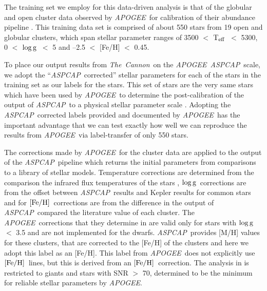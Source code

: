 \documentclass[12pt, preprint]{aastex}
\newcommand{\teff}{\mbox{$\rm T_{eff}$}}
\newcommand{\feh}{\mbox{$\rm [Fe/H]$}}
\newcommand{\logg}{\mbox{$\rm \log g$}}
\newcommand{\tc}{\textsl{The~Cannon}}
\newcommand{\apogee}{\textsl{APOGEE}}
\newcommand{\aspcap}{\textsl{ASPCAP}}
\begin{document}
The training set we employ for this data-driven analysis is that of the globular and open cluster data observed by \apogee\ for calibration of their abundance pipeline \citep{Meszaros2013}. This training data set is comprised of about 550 stars from 19 open and globular clusters, which span stellar parameter ranges of 3500 $<$ \teff\ $<$ 5300, 0 $<$ \logg\ $<$ 5 and --2.5 $<$ [Fe/H] $<$ 0.45. 


To place our output results from \tc\ on the \apogee\ \aspcap\ scale, we adopt the ``\aspcap\ corrected'' stellar parameters for each of the stars in the training set as our labels for the stars. This set of stars are the very same stars which have been used by \apogee\ to determine the post-calibration of the output of \aspcap\ to a physical stellar parameter scale \citep{Meszaros2013}. Adopting the \aspcap\ corrected labels provided and documented by \apogee\  has the important advantage that we can test exactly how well we can reproduce the results from \apogee\ via label-transfer of only 550 stars.

The corrections made by \apogee\ for the cluster data are applied to the output of the \aspcap\ pipeline which returns the initial parameters from comparisons to a library of stellar models. Temperature corrections are determined from the comparison the infrared flux temperatures of the stars \citep{Gonzalez2009}, \logg\ corrections are from the offset between \aspcap\ results and Kepler results for common stars and for \feh\ corrections are from the difference in the output of \aspcap\ compared the literature value of each cluster.  The \apogee\ corrections that they determine in \citet{Meszaros2013} are valid only for stars with \logg\ $<$ 3.5 and are not implemented for the dwarfs. \aspcap\ provides [M/H] values for these clusters, that are corrected to the [Fe/H] of the clusters and here we adopt this label as an [Fe/H]. This label from \apogee\ does not explicitly use \feh\ lines, but this is derived from an \feh\ correction. The analysis in \citet{Meszaros2013} is restricted to giants and stars with SNR $>$ 70, determined to be the minimum for reliable stellar parameters by \apogee.
\end{document}
